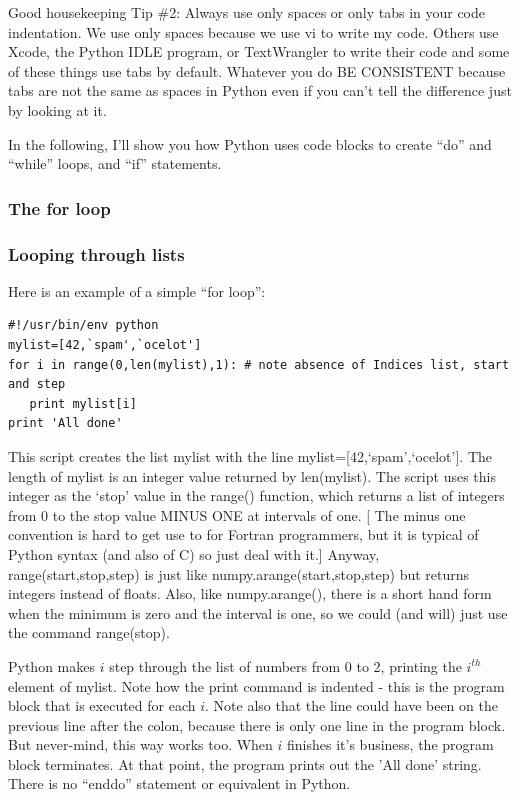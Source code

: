 \documentclass[11pt]{book}
\begin{document}
{{{ \color{magenta}Good housekeeping Tip \#2: Always use only spaces or only tabs in your code indentation. We use only spaces because we use {\color{blue}vi} to write my code.  Others use Xcode, the  Python IDLE program, or TextWrangler to write their code and some of these things use tabs by default.  Whatever you do BE CONSISTENT because tabs are not the same as spaces in Python even if you can't tell the difference just by looking at it.}




In the following, I'll show you how Python uses code blocks  to create ``do'' and ``while'' loops, and ``if'' statements.

\subsubsection{The for loop}
\subsubsection{Looping through lists}

Here is an example of a simple  ``for loop'':


{ \color{blue} \begin{verbatim}
#!/usr/bin/env python
mylist=[42,`spam',`ocelot']
for i in range(0,len(mylist),1): # note absence of Indices list, start and step
   print mylist[i]
print 'All done'
\end{verbatim}}

This script creates the list mylist with the line {\color{blue}mylist=[42,`spam',`ocelot']}.  The length of mylist is an integer value returned by {\color{blue}len(mylist)}.      The script uses this integer as the `stop' value in the  {\color{blue}range()} function,  which returns a list of integers from 0 to the stop value  MINUS ONE at intervals of one.   [ The minus one convention is hard to get use to  for Fortran programmers, but it is typical of Python syntax (and also of C) so just deal with it.]  Anyway, {\color{blue}range(start,stop,step)} is just like {\color{blue}numpy.arange(start,stop,step)} but returns integers instead of floats.  Also, like {\color{blue}numpy.arange()}, there is a short hand form when the minimum is zero and the interval is one, so we could (and will)  just use the command {\color{blue}range(stop)}.

   Python makes $i$ step through the list of numbers from 0 to 2, printing the $i^{th}$ element of {\color{blue}mylist}.  Note how the print command is indented - this is the program block that is executed for each $i$.   Note also that the line could have been on the previous line after the colon, because there is only one line in the program block.  But never-mind, this way works too.   When $i$ finishes it's business, the program block terminates.   At that point, the program prints out the 'All done' string.   There is no ``enddo'' statement or equivalent in Python.

}}
\end{document}
